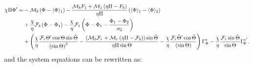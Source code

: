 \documentclass[../main.tex]{subfiles}
\begin{document}
	\begin{equation}
	\begin{aligned}
	\chi \Pi \Phi ' =  &- {\mathcal{M}_b}\left( {\Phi  - {\langle{\rm{\Phi }} \rangle_1}} \right)-\frac{{{\mathcal{M}_b}{F_1} + {\mathcal{M}_1}\left( {\eta \Pi  - {F_b}} \right)}}{{\eta \Pi }}\left( {{\langle{\rm{\Phi }} \rangle_1} - {\langle{\rm{\Phi }} \rangle_{2}}} \right)
	\\
	&+\frac{\chi }{\eta }{\mathcal{F}_b}\left( {{\rm{\Phi }} - {{\rm{\Phi }}_1}} \right)
	- \frac{\chi }{\eta }{\mathcal{F}_1}\left( {{{{{\rm{\Phi }}} - {{\rm{\Phi }}_1}}} - \frac{{{{\rm{\Phi }}_1} - {{\rm{\Phi }}_{2}}}}{{{\varkappa _{2}}}}} \right)
	\\
	&+ \left( {\frac{\chi }{\eta }\frac{{{\mathcal{F}_r}\Theta '\cos \Theta \sin \check{\Theta} }}{{{{\left( {\sin \Theta } \right)}^2}}}
		- \frac{{{(\mathcal{M}_b}{\mathcal{F}_r} + {\mathcal{M}_r}\left( {\eta \Pi  - {\mathcal{F}_b}}) \right)\sin\check{\Theta}}}{{\eta \Pi \sin \Theta }} - \frac{\chi }{\eta }\frac{{{\mathcal{F}_r}\check{\Theta} '\cos \check{\Theta}}}{{{{\left( {\sin \Theta } \right)}}}}} \right){\Gamma _{\Phi}^*}
	- \frac{\chi }{\eta }\frac{{{\mathcal{F}_r \sin \check{\Theta}}}}{{\sin \Theta }}\Gamma_{\!\Phi}^{* '}.
	\end{aligned}
	\label{neutralbitwalkphi}
	\end{equation}	
	and the system equations can be rewritten as:
\end{document}
